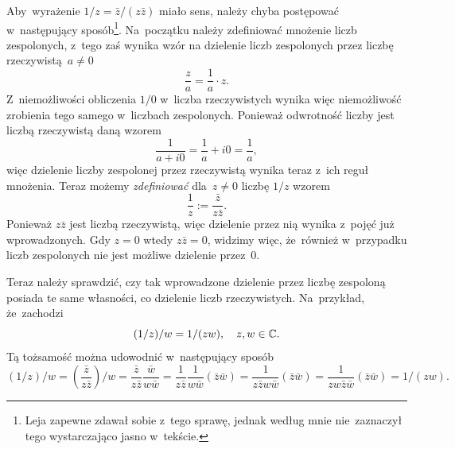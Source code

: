 \documentclass[a4paper,11pt]{article}
\numberwithin{equation}{section}
\begin{document}
\noindent
{} Aby~wyrażenie $1 / z = \bar{z} / ( z \bar{z} )$ miało sens, należy
chyba postępować w~następujący sposób\footnote{Leja zapewne zdawał sobie
  z~tego sprawę, jednak według mnie nie~zaznaczył tego wystarczająco jasno
  w~tekście.}. Na~początku należy zdefiniować mnożenie liczb zespolonych,
z~tego zaś wynika wzór na dzielenie liczb zespolonych przez liczbę
rzeczywistą~$a \neq 0$
\begin{equation}
  \label{eq:Leja-Funkcje-zespolone-02}
  \frac{ z }{ a } = \frac{ 1 }{ a } \cdot z.
\end{equation}
Z~niemożliwości obliczenia $1 / 0$ w~liczba rzeczywistych wynika więc
niemożliwość zrobienia tego samego w~liczbach zespolonych. Ponieważ
odwrotność liczby jest liczbą rzeczywistą daną wzorem
\begin{equation}
  \label{eq:Leja-Funkcje-zespolone-03}
  \frac{ 1 }{ a + i0 } = \frac{ 1 }{ a } + i0 =
  \frac{ 1 }{ a },
\end{equation}
więc dzielenie liczby zespolonej przez rzeczywistą wynika teraz z~ich
reguł mnożenia. Teraz możemy \textit{zdefiniować} dla~$z \neq 0$
liczbę $1 / z$ wzorem
\begin{equation}
  \label{eq:Leja-Funkcje-zespolone-04}
  \frac{ 1 }{ z } := \frac{ \bar{z} }{ z \bar{z} }.
\end{equation}
Ponieważ $z \bar{z}$ jest liczbą rzeczywistą, więc dzielenie przez nią
wynika z~pojęć już wprowadzonych. Gdy $z = 0$ wtedy $z \bar{z} = 0$,
widzimy więc, że~również w~przypadku liczb zespolonych nie jest
możliwe dzielenie przez~0.

Teraz należy sprawdzić, czy tak wprowadzone dzielenie przez liczbę
zespoloną posiada te same własności, co dzielenie liczb rzeczywistych.
Na~przykład, że~zachodzi
\begin{equation}
  \label{eq:Leja-Funkcje-zespolone-05}
  ( 1 / z ) / w = 1 / ( z w ), \quad
  z, w \in \mathbb{C}.
\end{equation}
Tą tożsamość można udowodnić w~następujący sposób
\begin{equation}
  \label{eq:Leja-Funkcje-zespolone-06}
    ( 1 / z ) / w =
    \left( \frac{ \bar{z} }{ z \bar{z} } \right) / w =
    \frac{ \bar{z} }{ z \bar{z} } \frac{ \bar{w} }{ w \bar{w} } =
    \frac{ 1 }{ z \bar{z} } \frac{ 1 }{ w \bar{w} }
    ( \bar{z} \bar{w} ) =
    \frac{ 1 }{ z \bar{z} w \bar{w} } ( \bar{z} \bar{w} ) =
    \frac{ 1 }{ z w \bar{z} \bar{w} } ( \bar{z} \bar{w} ) =
    1 / ( z w ).
\end{equation}
\end{document}
